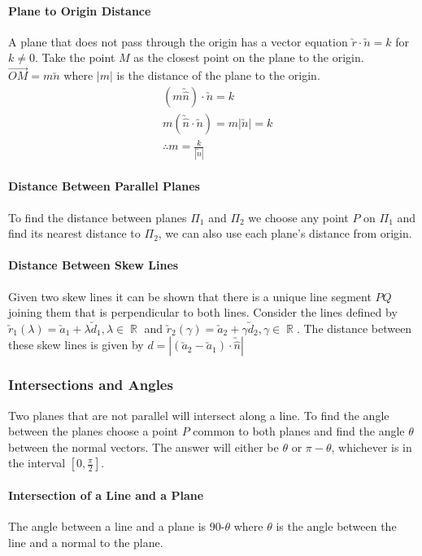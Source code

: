 \documentclass[a4paper,twoside]{article}
\DeclareMathOperator\R{\mathbb{R}}
\begin{document}
				\paragraph{Plane to Origin Distance} A plane that does not pass through the origin has a vector equation $\utilde{r}\cdot\utilde{n}=k$ for $k\neq0$. Take the point $M$ as the closest point on the plane to the origin. $\overrightarrow{OM}=m\utilde{n}$ where $|m|$ is the distance of the plane to the origin.
				\begin{align*}
					&\left(m\utilde{\hat{n}}\right)\cdot\utilde{n}=k \\
					&m\left(\utilde{\hat{n}}\cdot\utilde{n}\right)=m|\utilde{n}|=k\\
					&\therefore m=\frac{k}{|\utilde{n}|}
				\end{align*}
			
				\paragraph{Distance Between Parallel Planes} To find the distance between planes $\Pi_1$ and $\Pi_2$ we choose any point $P$ on $\Pi_1$ and find its nearest distance to $\Pi_2$, we can also use each plane's distance from origin.
				
				\paragraph{Distance Between Skew Lines} Given two skew lines it can be shown that there is a unique line segment $PQ$ joining them that is perpendicular to both lines. Consider the lines defined by $\utilde{r}_1(\lambda)=\utilde{a}_1+\lambda\utilde{d}_1,\lambda\in\R$ and $\utilde{r}_2(\gamma)=\utilde{a}_2+\gamma\utilde{d}_2,\gamma\in\R$. The distance between these skew lines is given by $d=\left|\left(\utilde{a}_2-\utilde{a}_1\right)\cdot\utilde{\hat{n}}\right|$
			
			\subsubsection{Intersections and Angles}
				Two planes that are not parallel will intersect along a line. To find the angle between the planes choose a point $P$ common to both planes and find the angle $\theta$ between the normal vectors. The answer will either be $\theta$ or $\pi-\theta$, whichever is in the interval $[0,\frac{\pi}{2}]$.
				
				\paragraph{Intersection of a Line and a Plane} The angle between a line and a plane is 90\degree-$\theta$ where $\theta$ is the angle between the line and a normal to the plane.
			
\end{document}
